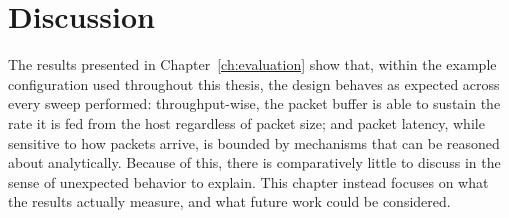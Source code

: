 \chapter{Discussion}\label{ch:discussion}

%
%
%
%
%

The results presented in Chapter~\ref{ch:evaluation} show that, within the example
configuration used throughout this thesis, the design behaves as expected across every sweep
performed: throughput-wise, the packet buffer is able to sustain the rate it is fed from the host 
regardless of packet size; and packet
latency, while sensitive to how packets arrive, is bounded by mechanisms that can be reasoned
about analytically. Because of this, there is comparatively little to discuss in the sense of
unexpected behavior to explain. This chapter instead focuses on what the results actually
measure, and what future work could be considered.

